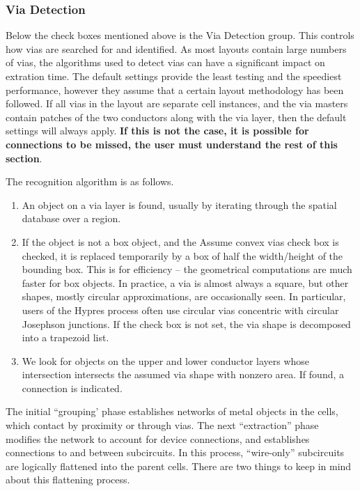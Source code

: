 \subsubsection{Via Detection}
\label{viafind}

Below the check boxes mentioned above is the {\cb Via Detection}
group.  This controls how vias are searched for and identified.  As
most layouts contain large numbers of vias, the algorithms used to
detect vias can have a significant impact on extration time.  The
default settings provide the least testing and the speediest
performance, however they assume that a certain layout methodology has
been followed.  If all vias in the layout are separate cell instances,
and the via masters contain patches of the two conductors along with
the via layer, then the default settings will always apply.  {\bf If
this is not the case, it is possible for connections to be missed, the
user must understand the rest of this section}.

The recognition algorithm is as follows.

\begin{enumerate}
\item{An object on a via layer is found, usually by iterating through
the spatial database over a region.}

\item{If the object is not a box object, and the {\cb Assume convex
vias} check box is checked, it is replaced temporarily by a box of
half the width/height of the bounding box.  This is for efficiency --
the geometrical computations are much faster for box objects.  In
practice, a via is almost always a square, but other shapes, mostly
circular approximations, are occasionally seen.  In particular, users
of the Hypres process often use circular vias concentric with circular
Josephson junctions.  If the check box is not set, the via shape is
decomposed into a trapezoid list.}

\item{We look for objects on the upper and lower conductor layers
whose intersection intersects the assumed via shape with nonzero area. 
If found, a connection is indicated.}
\end{enumerate}

The initial ``grouping' phase establishes networks of metal objects in
the cells, which contact by proximity or through vias.  The next
``extraction'' phase modifies the network to account for device
connections, and establishes connections to and between subcircuits. 
In this process, ``wire-only'' subcircuits are logically flattened
into the parent cells.  There are two things to keep in mind about
this flattening process.

